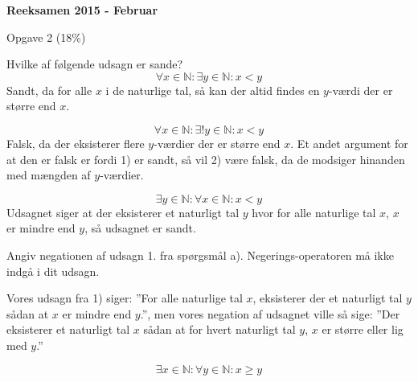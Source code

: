 \documentclass{article}
\begin{document}

\begin{center}
    \huge\bfseries Reeksamen 2015 - Februar \\
\end{center}

Opgave 2 (18\%)

Hvilke af følgende udsagn er sande?
\[
\forall x\in\mathbb{N}:\exists y\in\mathbb{N}:x<y
\]
Sandt, da for alle $x$ i de naturlige tal, så kan der altid findes en $y$-værdi der er større end $x$.

\[
\forall x\in\mathbb{N}: \exists! y\in\mathbb{N}:x<y
\]
Falsk, da der eksisterer flere $y$-værdier der er større end $x$. Et andet argument for at den er falsk er fordi 1) er sandt, så vil 2) være falsk, da de modsiger hinanden med mængden af $y$-værdier.

\[
\exists y\in\mathbb{N}:\forall x\in\mathbb{N}:x<y
\]
Udsagnet siger at der eksisterer et naturligt tal $y$ hvor for alle naturlige tal $x$, $x$ er mindre end $y$, så udsagnet er sandt.
\newline

Angiv negationen af udsagn 1. fra spørgsmål a).
Negerings-operatoren må ikke indgå i dit udsagn.
\newline

Vores udsagn fra 1) siger: ”For alle naturlige tal $x$, eksisterer der et naturligt tal $y$ sådan at $x$ er mindre end $y$.”, men vores negation af udsagnet ville så sige: ”Der eksisterer et naturligt tal $x$ sådan at for hvert naturligt tal $y$, $x$ er større eller lig med $y$.”

\[
\exists x\in\mathbb{N}:\forall y\in\mathbb{N}: x\geq y
\]
\end{document}
